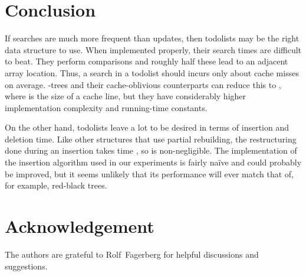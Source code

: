 \documentclass{patmorin}
\begin{document}
\section{Conclusion}

If searches are much more frequent than updates, then todolists may
be the right data structure to use.  When implemented properly, their
search times are difficult to beat.  They perform  comparisons and roughly half these lead to an adjacent array
location. Thus, a search in a todolist should incurs only about
 cache misses on average.   -trees
\cite{bayer.mccreight:organization} and their cache-oblivious counterparts
\cite{bender.demaine.ea:cache-oblivious,bender.duan.ea:locality-preserving}
can reduce this to , where  is the size of a cache line,
but they have considerably higher implementation complexity and running-time
constants.


On the other hand, todolists leave a lot to be desired in terms of
insertion and deletion time.  Like other structures that use partial
rebuilding, the restructuring done during an insertion takes time
, so is non-negligible.  The implementation of the
insertion algorithm used in our experiments is fairly naïve and could
probably be improved, but it seems unlikely that its performance will
ever match that of, for example, red-black trees.

\section*{Acknowledgement}

The authors are grateful to Rolf~Fagerberg for helpful discussions
and suggestions.






\end{document}
